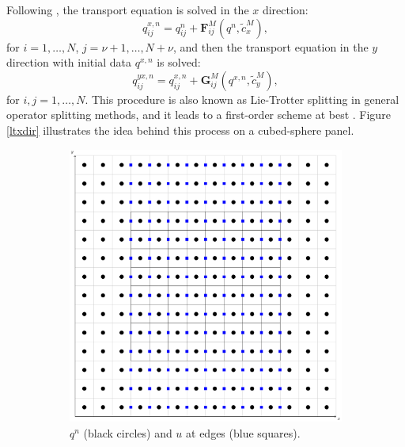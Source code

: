 \documentclass[preprint,12pt]{elsarticle}
\begin{document}
\begin{linenumbers}
Following \cite{lin:1996}, the transport equation is solved in the $x$ direction:
\begin{equation}
	{q}^{x,n}_{ij} =  {q}^{n}_{ij} + \mathbf{F}_{ij}^M({{q}^n},\tilde{c}^{M}_x),
\end{equation}
for $i=1, \ldots,N$, $j=\nu+1, \ldots, N+\nu$, and then the transport equation in the $y$ direction with initial data ${q}^{x,n}$ is solved:
\begin{equation}
	{q}^{yx,n}_{ij} = {q}^{x,n}_{ij} + \mathbf{G}_{ij}^M({q}^{x,n},\tilde{c}^{M}_y),
\end{equation}
for $i,j=1, \ldots,N$.
This procedure is also known as Lie-Trotter splitting in general operator splitting methods, and it leads to a first-order scheme at best \cite{holden:2010}.
Figure \ref{ltxdir} illustrates the idea behind this process on a cubed-sphere panel.
\begin{figure}[!htb]
	\centering
	\begin{subfigure}{0.3\textwidth}
		\centering
		\includegraphics[width=0.95\linewidth]{2d_grid_Qx}
		\caption{$q^n$ (black circles) and $u$ at edges (blue squares). \label{lt-Qx}}
	\end{subfigure}
	\begin{subfigure}{0.3\textwidth}
		\centering

\end{subfigure}
\end{figure}
\end{linenumbers}
\end{document}
